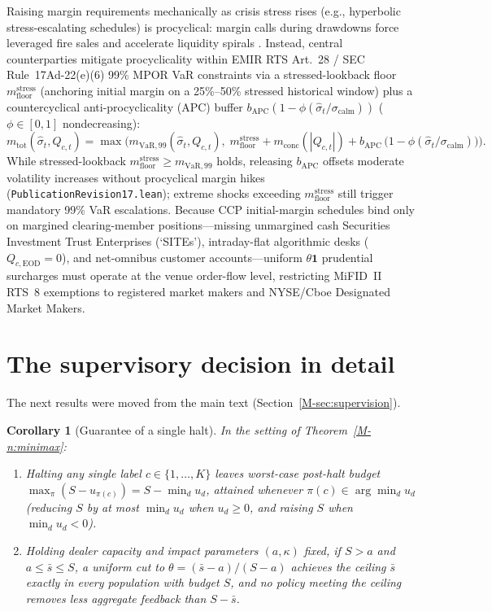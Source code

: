 \documentclass[12pt]{article}
\newtheorem{corollary}[theorem]{Corollary}
\theoremstyle{definition}
\theoremstyle{remark}
\begin{document}
Raising margin requirements mechanically as crisis stress rises (e.g., hyperbolic stress-escalating schedules) is procyclical: margin calls during drawdowns force leveraged fire sales and accelerate liquidity spirals \citep{brunnermeier2009}. Instead, central counterparties mitigate procyclicality within EMIR RTS Art.~28 / SEC Rule~17Ad-22(e)(6) 99\% MPOR VaR constraints via a stressed-lookback floor $m_{\mathrm{floor}}^{\mathrm{stress}}$ (anchoring initial margin on a 25\%--50\% stressed historical window) plus a countercyclical anti-procyclicality (APC) buffer $b_{\mathrm{APC}}(1 - \phi(\hat\sigma_t/\sigma_{\mathrm{calm}}))$ ($\phi \in [0, 1]$ nondecreasing):
\[
  m_{\mathrm{tot}}(\hat{\sigma}_t, Q_{c,t}) = \max\bigl(m_{\mathrm{VaR},99}(\hat{\sigma}_t, Q_{c,t}),\; m_{\mathrm{floor}}^{\mathrm{stress}} + m_{\mathrm{conc}}(|Q_{c,t}|) + b_{\mathrm{APC}}\,\bigl(1 - \phi(\hat{\sigma}_t / \sigma_{\mathrm{calm}})\bigr)\bigr).
\]
While stressed-lookback $m_{\mathrm{floor}}^{\mathrm{stress}} \ge m_{\mathrm{VaR},99}$ holds, releasing $b_{\mathrm{APC}}$ offsets moderate volatility increases without procyclical margin hikes (\nolinkurl{PublicationRevision17.lean}); extreme shocks exceeding $m_{\mathrm{floor}}^{\mathrm{stress}}$ still trigger mandatory 99\% VaR escalations. Because CCP initial-margin schedules bind only on margined clearing-member positions---missing unmargined cash Securities Investment Trust Enterprises (`SITEs'), intraday-flat algorithmic desks ($Q_{c,\mathrm{EOD}}=0$), and net-omnibus customer accounts---uniform $\theta \mathbf{1}$ prudential surcharges must operate at the venue order-flow level, restricting MiFID~II RTS~8 exemptions to registered market makers and NYSE/Cboe Designated Market Makers.

\section{The supervisory decision in detail}\label{app:decisionfull}

\noindent The next results were moved from the main text (Section~\ref{M-sec:supervision}).

\begin{corollary}[Guarantee of a single halt]\label{cor:robustuniform}
In the setting of Theorem~\ref{M-n:minimax}:
\begin{enumerate}
  \item[(i)] Halting any single label $c \in \{1,\dots,K\}$ leaves worst-case post-halt budget $\max_\pi (S - u_{\pi(c)}) = S - \min_d u_d$, attained whenever $\pi(c) \in \arg\min_d u_d$ (reducing $S$ by at most $\min_d u_d$ when $u_d \ge 0$, and raising $S$ when $\min_d u_d < 0$).
  \item[(ii)] Holding dealer capacity and impact parameters $(a, \kappa)$ fixed, if $S>a$ and $a\le\bar{s}\le S$, a uniform cut to $\theta = (\bar{s} - a)/(S - a)$ achieves the ceiling $\bar{s}$ exactly in every population with budget $S$, and no policy meeting the ceiling removes less aggregate feedback than $S - \bar{s}$.
\end{enumerate}
\end{corollary}
\end{document}
